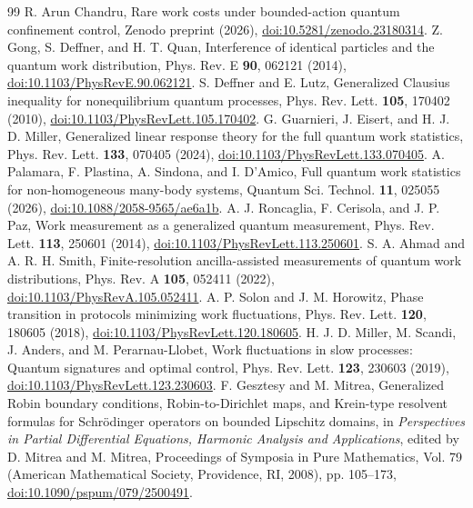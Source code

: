 \documentclass[aps,pra,reprint,superscriptaddress,longbibliography]{revtex4-2}
\begin{document}
\begin{thebibliography}{99}
 R. Arun Chandru, Rare work costs under bounded-action quantum confinement control, Zenodo preprint (2026), \href{https://doi.org/10.5281/zenodo.23180314}{doi:10.5281/zenodo.23180314}.
 Z. Gong, S. Deffner, and H. T. Quan, Interference of identical particles and the quantum work distribution, Phys. Rev. E \textbf{90}, 062121 (2014), \href{https://doi.org/10.1103/PhysRevE.90.062121}{doi:10.1103/PhysRevE.90.062121}.
 S. Deffner and E. Lutz, Generalized Clausius inequality for nonequilibrium quantum processes, Phys. Rev. Lett. \textbf{105}, 170402 (2010), \href{https://doi.org/10.1103/PhysRevLett.105.170402}{doi:10.1103/PhysRevLett.105.170402}.
 G. Guarnieri, J. Eisert, and H. J. D. Miller, Generalized linear response theory for the full quantum work statistics, Phys. Rev. Lett. \textbf{133}, 070405 (2024), \href{https://doi.org/10.1103/PhysRevLett.133.070405}{doi:10.1103/PhysRevLett.133.070405}.
 A. Palamara, F. Plastina, A. Sindona, and I. D'Amico, Full quantum work statistics for non-homogeneous many-body systems, Quantum Sci. Technol. \textbf{11}, 025055 (2026), \href{https://doi.org/10.1088/2058-9565/ae6a1b}{doi:10.1088/2058-9565/ae6a1b}.
 A. J. Roncaglia, F. Cerisola, and J. P. Paz, Work measurement as a generalized quantum measurement, Phys. Rev. Lett. \textbf{113}, 250601 (2014), \href{https://doi.org/10.1103/PhysRevLett.113.250601}{doi:10.1103/PhysRevLett.113.250601}.
 S. A. Ahmad and A. R. H. Smith, Finite-resolution ancilla-assisted measurements of quantum work distributions, Phys. Rev. A \textbf{105}, 052411 (2022), \href{https://doi.org/10.1103/PhysRevA.105.052411}{doi:10.1103/PhysRevA.105.052411}.
 A. P. Solon and J. M. Horowitz, Phase transition in protocols minimizing work fluctuations, Phys. Rev. Lett. \textbf{120}, 180605 (2018), \href{https://doi.org/10.1103/PhysRevLett.120.180605}{doi:10.1103/PhysRevLett.120.180605}.
 H. J. D. Miller, M. Scandi, J. Anders, and M. Perarnau-Llobet, Work fluctuations in slow processes: Quantum signatures and optimal control, Phys. Rev. Lett. \textbf{123}, 230603 (2019), \href{https://doi.org/10.1103/PhysRevLett.123.230603}{doi:10.1103/PhysRevLett.123.230603}.
 F. Gesztesy and M. Mitrea, Generalized Robin boundary conditions, Robin-to-Dirichlet maps, and Krein-type resolvent formulas for Schr\"odinger operators on bounded Lipschitz domains, in \textit{Perspectives in Partial Differential Equations, Harmonic Analysis and Applications}, edited by D. Mitrea and M. Mitrea, Proceedings of Symposia in Pure Mathematics, Vol. 79 (American Mathematical Society, Providence, RI, 2008), pp. 105--173, \href{https://doi.org/10.1090/pspum/079/2500491}{doi:10.1090/pspum/079/2500491}.

\end{thebibliography}
\end{document}
